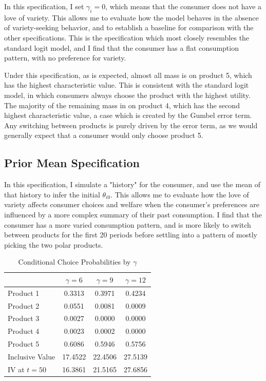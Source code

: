 \documentclass[12pt]{article}
\begin{document}
    In this specification, I set $\gamma_i = 0$, which means that the consumer does not have a love of variety. This allows me to evaluate how the model behaves in the absence of variety-seeking behavior, and to establish a baseline for comparison with the other specifications. This is the specification which most closely resembles the standard logit model, and I find that the consumer has a flat consumption pattern, with no preference for variety.

    Under this specification, as is expected, almost all mass is on product 5, which has the highest characteristic value. This is consistent with the standard logit model, in which consumers always choose the product with the highest utility. The majority of the remaining mass in on product 4, which has the second highest characteristic value, a case which is created by the Gumbel error term. Any switching between products is purely driven by the error term, as we would generally expect that a consumer would only choose product 5.

    \subsection{Prior Mean Specification}
    In this specification, I simulate a "history" for the consumer, and use the mean of that history to infer the initial $\theta_{i0}$. This allows me to evaluate how the love of variety affects consumer choices and welfare when the consumer's preferences are influenced by a more complex summary of their past consumption. I find that the consumer has a more varied consumption pattern, and is more likely to switch between products for the first 20 periods before settling into a pattern of mostly picking the two polar products.

    \begin{table}[h]
    \centering
    \caption{Conditional Choice Probabilities by $\gamma$}
    \begin{tabular}{lccc}
    \hline\hline
    & $\gamma = 6$ & $\gamma = 9$ & $\gamma = 12$ \\
    \hline
    Product 1       & 0.3313  & 0.3971  & 0.4234  \\
    Product 2       & 0.0551  & 0.0081  & 0.0009  \\
    Product 3       & 0.0027  & 0.0000  & 0.0000  \\
    Product 4       & 0.0023  & 0.0002  & 0.0000  \\
    Product 5       & 0.6086  & 0.5946  & 0.5756  \\
    \hline
    Inclusive Value & 17.4522 & 22.4506 & 27.5139 \\
    IV at $t=50$    & 16.3861 & 21.5165 & 27.6856 \\
    \hline\hline
    \end{tabular}
    \end{table}
\end{document}
